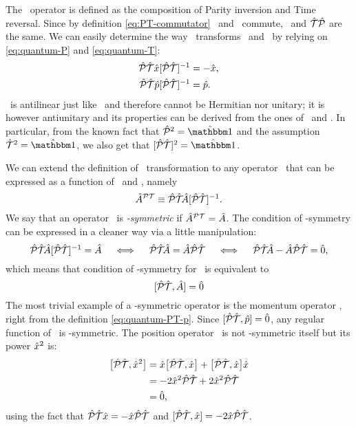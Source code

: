         The \hPT\ operator is defined as the composition of Parity inversion and Time reversal. Since by definition \eqref{eq:PT-commutator} \hP\ and \hT\ commute, \hPT\ and $\mathcal{\hat{T}}\mathcal{\hat{P}}$ are the same. We can easily determine the way \hPT\ transforms \hx\ and \hp\ by relying on \eqref{eq:quantum-P} and \eqref{eq:quantum-T}:
        \begin{align}
            \label{eq:quantum-PT-x}
            \hPT\hx\bqty*{\hPT}\!^{-1}
            &= -\hx
            \mycomma
            \\
            \label{eq:quantum-PT-p}
            \hPT\hp\bqty*{\hPT}\!^{-1}
            &= \hp
            \myperiod
        \end{align}
        \hPT\ is antilinear just like \hT\ and therefore cannot be Hermitian nor unitary; it is however antiunitary and its properties can be derived from the ones of \hP\ and \hT. In particular, from the known fact that $\hP^2 = \hidM$ and the assumption $\hT^2 = \hidM$, we also get that $\bqty*{\hPT}\!^2 = \hidM$. 

        We can extend the definition of \PT\ transformation to any operator \hA\ that can be expressed as a function of \hx\ and \hp, namely
        \begin{equation}
            \label{eq:pt-transform}
            \hA^{\PT} \equiv \PTtransform{\hA}
            \myperiod
        \end{equation}
        We say that an operator \hA\ is \emph{\PT-symmetric} if $\hat{A}^{\mathcal{P}\mathcal{T}} = \hat{A}$. The condition of \PT-symmetry can be expressed in a cleaner way via a little manipulation:
        \begin{equation*}
            \PTtransform{\hA} = \hA
            \quad\iff\quad
            \hPT\!\hA = \hA\hPT
            \quad\iff\quad
            \hPT\!\hA - \hA\hPT = \hzero
            \mycomma
        \end{equation*}
        which means that condition of \PT-symmetry for \hA\ is equivalent to
        \begin{equation}
            \label{eq:pt-symmetric-operator}
            \comm*{\hPT}{\hA}\! = \hzero
        \end{equation}
        The most trivial example of a \PT-symmetric operator is the momentum operator \hp, right from the definition \eqref{eq:quantum-PT-p}. Since $\comm*{\hPT}{\hp}\! = \hzero$, any regular function of \hp\ is \PT-symmetric. The position operator \hx\ is not \PT-symmetric itself but its power $\hat{x}^2$ is:
        \begin{align*}
            \bigl[\mathcal{\hat{P}}\mathcal{\hat{T}},\hat{x}^2\bigr]
            &= \hat{x} \bigl[\mathcal{\hat{P}}\mathcal{\hat{T}},\hat{x}\bigr] + \bigl[\mathcal{\hat{P}}\mathcal{\hat{T}},\hat{x}\bigr] \hat{x} \\
            &= -2\hat{x}^2\mathcal{\hat{P}}\mathcal{\hat{T}} + 2\hat{x}^2\mathcal{\hat{P}}\mathcal{\hat{T}} \\
            &= \hat{0} 
            \text{,}
        \end{align*}
        using the fact that $\mathcal{\hat{P}}\mathcal{\hat{T}} \hat{x} = -\hat{x} \mathcal{\hat{P}}\mathcal{\hat{T}}$ and $\comm*{\hPT}{\hx}\! = -2\hx\hPT$.

